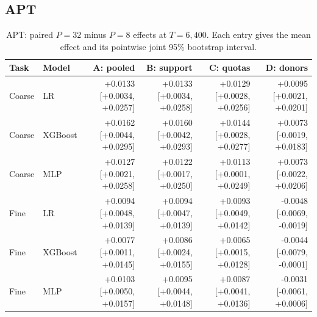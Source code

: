 \clearpage
\subsection{APT}
\begin{table}[htbp]\centering\small
\setlength{\tabcolsep}{3pt}\renewcommand{\arraystretch}{1.2}
\caption{APT: paired $P=32$ minus $P=8$ effects at $T=6{,}400$. Each entry gives the mean effect and its pointwise joint 95\% bootstrap interval.}
\begin{tabular}{llrrrr}\toprule
Task & Model & A: pooled & B: support & C: quotas & D: donors \\\midrule
Coarse & LR & \makecell{+0.0133\\{[+0.0034, +0.0257]}} & \makecell{+0.0133\\{[+0.0034, +0.0258]}} & \makecell{+0.0129\\{[+0.0028, +0.0256]}} & \makecell{+0.0095\\{[+0.0021, +0.0201]}} \\
Coarse & XGBoost & \makecell{+0.0162\\{[+0.0044, +0.0295]}} & \makecell{+0.0160\\{[+0.0042, +0.0293]}} & \makecell{+0.0144\\{[+0.0028, +0.0277]}} & \makecell{+0.0073\\{[-0.0019, +0.0183]}} \\
Coarse & MLP & \makecell{+0.0127\\{[+0.0021, +0.0258]}} & \makecell{+0.0122\\{[+0.0017, +0.0250]}} & \makecell{+0.0113\\{[+0.0001, +0.0249]}} & \makecell{+0.0073\\{[-0.0022, +0.0206]}} \\
Fine & LR & \makecell{+0.0094\\{[+0.0048, +0.0139]}} & \makecell{+0.0094\\{[+0.0047, +0.0139]}} & \makecell{+0.0093\\{[+0.0049, +0.0142]}} & \makecell{-0.0048\\{[-0.0069, -0.0019]}} \\
Fine & XGBoost & \makecell{+0.0077\\{[+0.0011, +0.0145]}} & \makecell{+0.0086\\{[+0.0024, +0.0155]}} & \makecell{+0.0065\\{[+0.0015, +0.0128]}} & \makecell{-0.0044\\{[-0.0079, -0.0001]}} \\
Fine & MLP & \makecell{+0.0103\\{[+0.0050, +0.0157]}} & \makecell{+0.0095\\{[+0.0044, +0.0148]}} & \makecell{+0.0087\\{[+0.0041, +0.0136]}} & \makecell{-0.0031\\{[-0.0061, +0.0006]}} \\
\bottomrule\end{tabular}\end{table}
